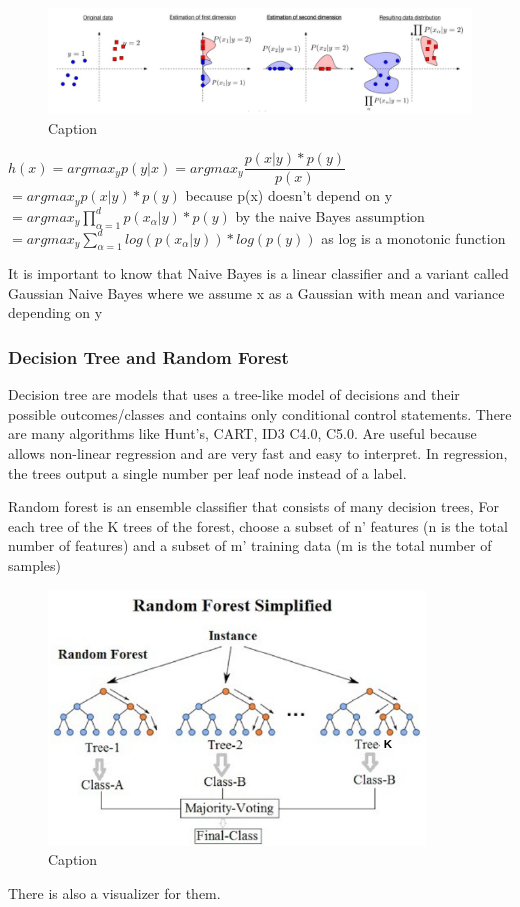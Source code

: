 \begin{figure}[H]
    \centering
    \includegraphics[scale=0.3]{images/GB/GB4.png}
    \caption{Caption}
    \label{fig:enter-label}
\end{figure}

$ h(x) = argmax_y p(y|x) = argmax_y \dfrac{p(x|y)* p(y)}{p(x)} $\\
$= argmax_y p(x|y)* p(y)$ because p(x) doesn't depend on y \\
$= argmax_y \prod\limits_{\alpha=1}^d p(x_{\alpha}|y)* p(y)$ by the naive Bayes assumption\\
$= argmax_y \sum\limits_{\alpha=1}^d log(p(x_{\alpha}|y)) * log(p(y))$ as log is a monotonic function

It is important to know that Naive Bayes is a linear classifier and a variant called Gaussian Naive Bayes where we assume x as a Gaussian with mean and variance depending on y
\subsubsection{Decision Tree and Random Forest}
Decision tree are models that uses a tree-like model of decisions and their possible outcomes/classes and contains only conditional control statements. There are many algorithms like Hunt's, CART, ID3 C4.0, C5.0. Are useful because allows non-linear regression and are very fast and easy to interpret.  In regression, the trees output a single number per leaf node instead of a label.

Random forest  is an ensemble classifier that consists of many decision trees, For each tree of the K trees of the forest, choose a subset of n’ features (n is the total number of features) and a subset of m’ training data (m is the total number of samples)
 \begin{figure}[H]
     \centering
     \includegraphics[scale=0.8]{images/GB/GB6.png}
     \caption{Caption}
     \label{fig:enter-label}
 \end{figure}
 There is also a visualizer for them.
